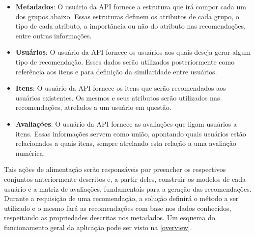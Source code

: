 \documentclass[12pt, openright, oneside, a4paper, brazil]{abntex2}
\begin{document}
\begin{itemize}

	\item \textbf{Metadados}: O usuário da API fornece a estrutura que irá compor cada um dos grupos abaixo. Essas estruturas definem os atributos de cada grupo, o tipo de cada atributo, a importância ou não do atributo nas recomendações, entre outras informações.

	\item \textbf{Usuários}: O usuário da API fornece os usuários aos quais deseja gerar algum tipo de recomendação. Esses dados serão utilizados posteriormente como referência aos itens e para definição da similaridade entre usuários.

	\item \textbf{Itens}: O usuário da API fornece os itens que serão recomendados aos usuários existentes. Os mesmos e seus atributos serão utilizados nas recomendações, atrelados a um usuário em questão.

	\item \textbf{Avaliações}: O usuário da API fornece as avaliações que ligam usuários a itens. Essas informações servem como união, apontando quais usuários estão relacionados a quais itens, sempre atrelando esta relação a uma avaliação numérica.

\end{itemize}

Tais ações de alimentação serão responsáveis por preencher os respectivos conjuntos anteriormente descritos e, a partir deles, construir os modelos de cada usuário e a matriz de avaliações, fundamentais para a geração das recomendações. Durante a requisição de uma recomendação, a solução definirá o método a ser utilizado e o mesmo fará as recomendações com base nos dados conhecidos, respeitando as propriedades descritas nos metadados. Um esquema do funcionamento geral da aplicação pode ser visto na \autoref{overview}.
\end{document}
